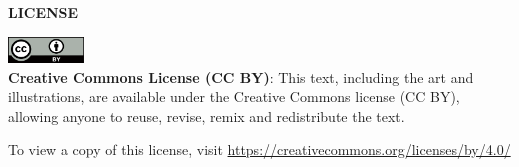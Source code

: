 \vfill

\begin{center}
  \fontsize{14pt}{16pt}\selectfont\textcolor{titletextcolour}{\textbf{LICENSE}}
\end{center}

\begin{center}

  \noindent \includegraphics[width=2cm]{figures/cc-by} \\

  \noindent \textbf{Creative Commons License (CC BY)}: This text, including the art and illustrations, are available under the Creative Commons license (CC BY), allowing anyone to reuse, revise, remix and redistribute the text.

  \noindent To view a copy of this license, visit \url{https://creativecommons.org/licenses/by/4.0/}
\end{center}

\setlength{\parskip}{\baselineskip}
